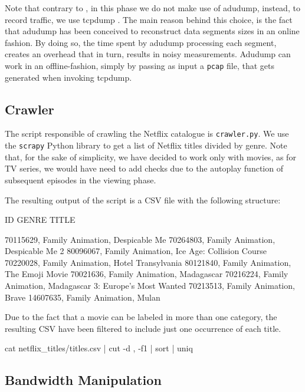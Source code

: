 Note that contrary to \cite{netflix-real-time}, in this phase we do not make
use of adudump, instead, to record traffic, we use tcpdump \cite{libpcap}. The
main reason behind this choice, is the fact that adudump has been conceived to
reconstruct data segments sizes in an online fashion. By doing so, the time
spent by adudump processing each segment, creates an overhead that in turn,
results in noisy measurements. Adudump can work in an offline-fashion, simply
by passing as input a \texttt{pcap} \cite{libpcap} file, that gets generated
when invoking tcpdump. 

\subsection{Crawler}

The script responsible of crawling the Netflix catalogue is
\texttt{crawler.py}. We use the \texttt{scrapy} Python library \cite{scrapy}
to get a list of Netflix titles divided by genre. Note that, for the sake of
simplicity, we have decided to work only with movies, as for TV series, we
would have need to add checks due to the autoplay function of subsequent
episodes in the viewing phase.

The resulting output of the script is a CSV file with the following structure:

\begin{adu}[caption={Sample of crawled movies}, label={lst:crawl_output}]
ID        GENRE             TITLE

70115629, Family Animation, Despicable Me
70264803, Family Animation, Despicable Me 2
80096067, Family Animation, Ice Age: Collision Course
70220028, Family Animation, Hotel Transylvania
80121840, Family Animation, The Emoji Movie
70021636, Family Animation, Madagascar
70216224, Family Animation, Madagascar 3: Europe's Most Wanted
70213513, Family Animation, Brave
14607635, Family Animation, Mulan
\end{adu}

Due to the fact that a movie can be labeled in more than one category, the
resulting CSV have been filtered to include just one occurrence of each title.

\begin{bash_script}[caption={Command to filter out unique IDs}, label={titles}]
cat netflix_titles/titles.csv | cut -d , -f1 | sort | uniq
\end{bash_script}

\subsection{Bandwidth Manipulation}

